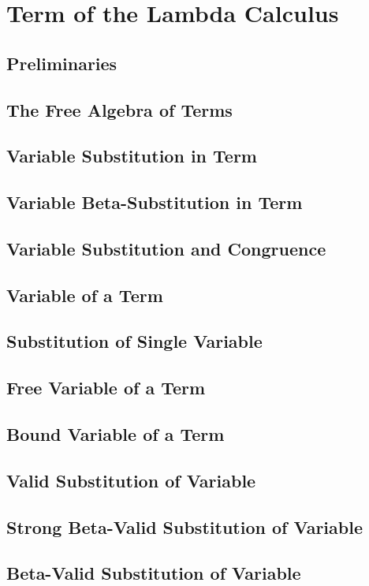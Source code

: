 \section{Term of the Lambda Calculus}
    \subsection{Preliminaries}
        
    \subsection{The Free Algebra of Terms}
        
    \subsection{Variable Substitution in Term}
        
    \subsection{Variable Beta-Substitution in Term}
        
    \subsection{Variable Substitution and Congruence}
        
    \subsection{Variable of a Term}
        
    \subsection{Substitution of Single Variable}
        
    \subsection{Free Variable of a Term}
        
    \subsection{Bound Variable of a Term}
        
    \subsection{Valid Substitution of Variable}
      
     \subsection{Strong Beta-Valid Substitution of Variable}
        
     \subsection{Beta-Valid Substitution of Variable}
        

